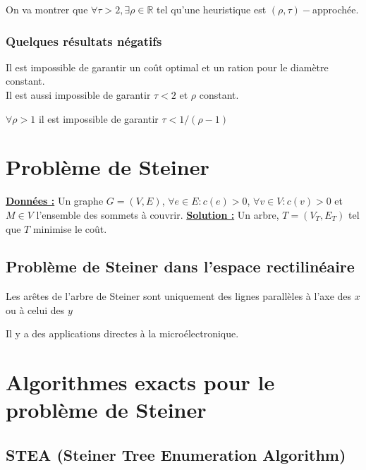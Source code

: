 \documentclass[a4paper,11pt]{thesis}
\begin{document}
On va montrer que $\forall \tau > 2, \exists \rho \in \mathbb{R}$ tel qu'une heuristique est $(\rho,
\tau)-$approchée.

\subsubsection{Quelques r\'{e}sultats n\'{e}gatifs}

Il est impossible de garantir un coût optimal et un ration pour le diamètre constant.\\

Il est aussi impossible de garantir $\tau < 2$ et $\rho$ constant.\\

\begin{thrm}
    $\forall \rho > 1$ il est impossible de garantir $\tau < 1 /(\rho - 1)$
\end{thrm}


\section{Probl\`{e}me de Steiner}

\textbf{\underline{Données :}} Un graphe $G = (V, E)$, $\forall e \in E : c(e) > 0$, $\forall v
\in V : c(v) > 0$ et $M \in V$ l'ensemble des sommets à couvrir.
\textbf{\underline{Solution :}} Un arbre, $T = (V_T, E_T)$ tel que $T$ minimise le coût.

\subsection{Probl\`{e}me de Steiner dans l'espace rectilin\'{e}aire}


Les arêtes de l'arbre de Steiner sont uniquement des lignes parallèles à l'axe des $x$ ou à celui
des $y$

Il y a des applications directes à la microélectronique.

\section{Algorithmes exacts pour le probl\`{e}me de Steiner}

\subsection{STEA (Steiner Tree Enumeration Algorithm)}
\end{document}
